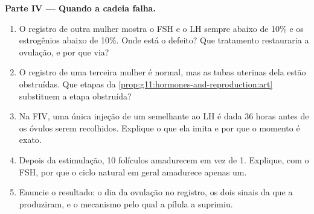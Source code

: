 \begin{problem}
\medskip
\noindent\textbf{Parte IV --- Quando a cadeia falha.}
\begin{enumerate}[resume]
  \item O registro de outra mulher mostra o FSH e o LH sempre abaixo de
        10\% e os estrogênios abaixo de 10\%. Onde está o defeito? Que
        tratamento restauraria a ovulação, e por que via?
  \item O registro de uma terceira mulher é normal, mas as tubas
        uterinas dela estão obstruídas. Que etapas da
        \cref{prop:g11:hormones-and-reproduction:art} substituem a
        etapa obstruída?
  \item Na FIV, uma única injeção de um  semelhante ao LH é
        dada 36 horas antes de os óvulos serem recolhidos. Explique o
        que ela imita e por que o momento é exato.
  \item Depois da estimulação, 10 folículos amadurecem em vez de 1.
        Explique, com o FSH, por que o ciclo natural em geral amadurece
        apenas um.
  \item Enuncie o resultado: o dia da ovulação no registro, os dois
        sinais da  que a produziram, e o mecanismo pelo
        qual a pílula a suprimiu.
\end{enumerate}
\end{problem}

